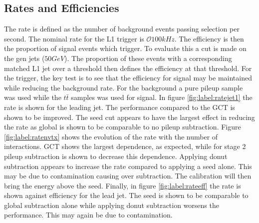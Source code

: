 \subsection{Rates and Efficiencies}
The rate is defined as the number of 
background events passing selection per second. The nominal rate for the L1 trigger is $\mathcal{O}100kHz$. 
The efficiency is then the proportion of signal events which trigger. To evaluate this a 
cut is made on the gen jets ($50GeV$). The proportion of these events with a 
corresponding matched L1 jet over a threshold then defines the efficiency at that threshold.  For 
the trigger, the key test is to see that the efficiency for signal may be 
maintained while reducing the background rate. For the background a pure pileup sample was used 
while the $t\bar{t}$ samples was used for signal. In figure \ref{fig:label:ratejet1} the rate is shown 
for the leading jet. The performance compared to the GCT is shown to be improved. 
The seed cut appears to have the largest effect in reducing the rate as global 
is shown to be comparable to no pileup subtraction. Figure \ref{fig:label:ratenvtx} shows the evolution of 
the rate with the number of interactions. GCT shows the largest dependence, as expected, while 
for stage 2 pileup subtraction is shown to decrease this dependence. Applying donut subtraction appears 
to increase the rate compared to applying a seed alone. This may be due to 
contamination causing over subtraction. The calibration will then bring the energy above the seed. Finally, 
in figure \ref{fig:label:rateeff} the rate is shown against efficiency for the lead jet. The seed 
is shown to be comparable to global subtraction alone while applying donut subtraction worsens the 
performance. This may again be due to contamination.
